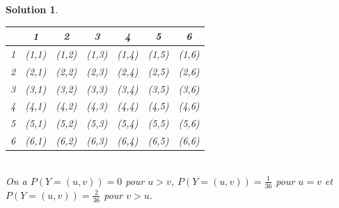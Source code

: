 \documentclass[a4paper, 12pt, french]{article}
\theoremstyle{break}
\newtheorem{sol}{Solution}[section]
\begin{document}
\begin{sol}
\begin{enumerate}
\begin{tabular}{|*7{c|}}
			\hline
				& 1 & 2 & 3 & 4 & 5 & 6 \\ \hline
			1	& (1,1) & (1,2) & (1,3) & (1,4) & (1,5) & (1,6) \\
			2	& (2,1) & (2,2) & (2,3) & (2,4) & (2,5) & (2,6) \\
			3	& (3,1) & (3,2) & (3,3) & (3,4) & (3,5) & (3,6) \\
			4	& (4,1) & (4,2) & (4,3) & (4,4) & (4,5) & (4,6) \\
			5	& (5,1) & (5,2) & (5,3) & (5,4) & (5,5) & (5,6) \\
			6	& (6,1) & (6,2) & (6,3) & (6,4) & (6,5) & (6,6) \\
			\hline
		\end{tabular}
		\\ On a $P(Y = (u,v)) = 0$ pour $u > v$, $P(Y = (u,v)) = \frac{1}{36}$ pour $u=v$ et $P(Y = (u,v)) = \frac{2}{36}$ pour $v > u$. \marginpar{$\square$}
	\end{enumerate}
\end{sol}
\end{document}
